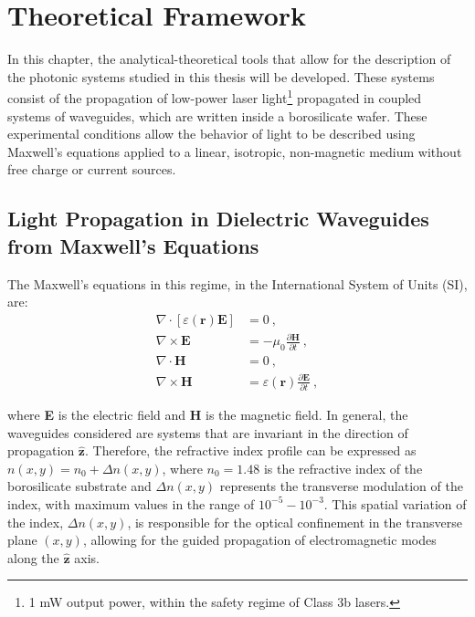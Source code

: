 \chapter{Theoretical Framework \label{cap:teo}}

In this chapter, the analytical-theoretical tools that allow for the description of the photonic systems studied in this thesis will be developed. These systems consist of the propagation of low-power laser light\footnote{1 mW output power, within the safety regime of Class 3b lasers.} propagated in coupled systems of waveguides, which are written inside a borosilicate wafer. These experimental conditions allow the behavior of light to be described using Maxwell's equations applied to a linear, isotropic, non-magnetic medium without free charge or current sources.
\section{Light Propagation in Dielectric Waveguides from Maxwell's Equations \label{cap:maxwell}}

The Maxwell's equations in this regime, in the International System of Units (SI), are:
\begin{align}
	\nabla\cdot\left[\varepsilon(\textbf{r})\textbf{E}\right] &= 0 \ , \label{eqn:gauss}
	\\	
	\nabla\times\textbf{E} &= -\mu_0 \frac{\partial \textbf{H}}{\partial t} \ , \label{eqn:faraday-lenz}
	\\	
	\nabla\cdot\textbf{H} &= 0 \ , \label{eqn:div0}
	\\	
	\nabla\times\textbf{H} &=\varepsilon(\textbf{r}) \frac{\partial \textbf{E}}{\partial t} \ , \label{eqn:ampere-maxwell}
\end{align}

where \textbf{E} is the electric field and \textbf{H} is the magnetic field. In general, the waveguides considered are systems that are invariant in the direction of propagation $\hat{\textbf{z}}$. Therefore, the refractive index profile can be expressed as $n(x,y) = n_0 + \Delta n(x,y)$, where $n_0 = 1.48$ is the refractive index of the borosilicate substrate and $\Delta n(x,y)$ represents the transverse modulation of the index, with maximum values in the range of $10^{-5} - 10^{-3}$. This spatial variation of the index, $\Delta n(x,y)$, is responsible for the optical confinement in the transverse plane $(x,y)$, allowing for the guided propagation of electromagnetic modes along the $\hat{\textbf{z}}$ axis.

